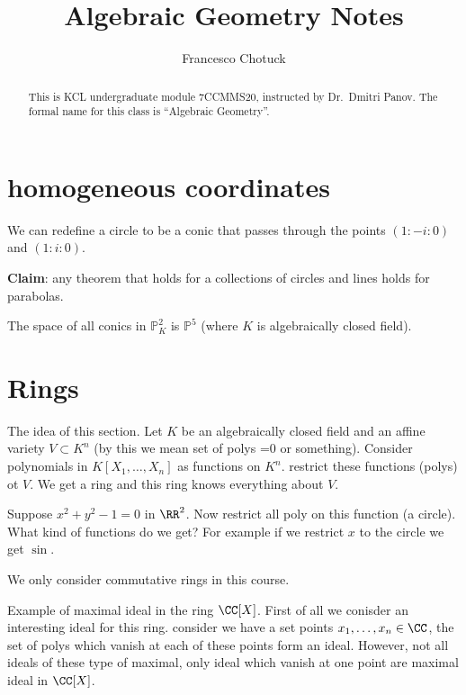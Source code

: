 \documentclass[12pt, a4paper]{article}
\title{Algebraic Geometry Notes}
\date{}
\author{Francesco Chotuck}
\newcommand{\PP}{\mathbb P}
\begin{document}
\maketitle

\begin{abstract}
    \noindent This is KCL undergraduate module 7CCMMS20, instructed by Dr.\ Dmitri Panov. The formal name for this class is ``Algebraic Geometry''.
\end{abstract}

\tableofcontents

\pagebreak

\section{homogeneous coordinates}

We can redefine a circle to be a conic that passes through the points \((1:-i:0)\) and \((1:i:0)\). 

\textbf{Claim}: any theorem that holds for a collections of circles and lines holds for parabolas.

The space of all conics in \(\PP^2_{K}\) is \(\PP^5\) (where \(K\) is algebraically closed field).


\section{Rings}

The idea of this section. Let \(K\) be an algebraically closed field and an affine variety \(V \subset K^n\) (by this we mean set of polys =0 or something). Consider polynomials in \(K[X_1,\ldots,X_n]\) as functions on \(K^n\). restrict these functions (polys) ot \(V\). We get a ring and this ring knows everything about \(V\). 

\begin{example}
    Suppose \(x^2+y^2-1=0\) in \(\RR^2\). Now restrict all poly on this function (a circle). What kind of functions do we get? For example if we restrict \(x\) to the circle we get \(\sin\).
\end{example}

We only consider commutative rings in this course.

\begin{example}
    Example of maximal ideal in the ring \(\CC[X]\). First of all we conisder an interesting ideal for this ring. consider we have a set points \(x_1,\ldots,x_n \in \CC\), the set of polys which vanish at each of these points form an ideal. However, not all ideals of these type of maximal, only ideal which vanish at one point are maximal ideal in \(\CC[X]\). 
\end{example}
\end{document}
